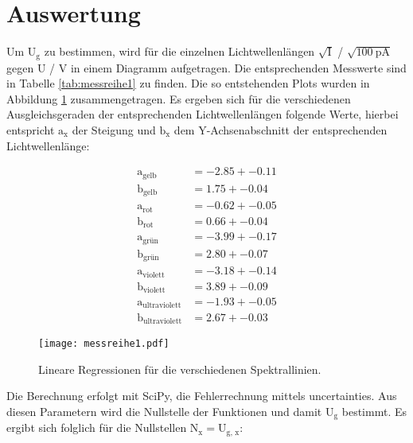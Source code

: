 \section{Auswertung}
\label{sec:Auswertung}
Um $\text{U}_\text{g}$ zu bestimmen, wird für die einzelnen Lichtwellenlängen $\sqrt{\text{I}}$ / $\sqrt{\SI{100}{\pico\ampere}}$ gegen $\text{U}$ / $\si{\volt}$ in einem Diagramm aufgetragen.
Die entsprechenden Messwerte sind in Tabelle \ref{tab:messreihe1} zu finden.
Die so entstehenden Plots wurden in Abbildung \ref{fig:messreihe1} zusammengetragen.
Es ergeben sich für die verschiedenen Ausgleichsgeraden der entsprechenden Lichtwellenlängen folgende Werte, hierbei entspricht $\text{a}_\text{x}$ der Steigung und $\text{b}_\text{x}$ dem Y-Achsenabschnitt der entsprechenden Lichtwellenlänge:

\begin{align*}
  \text{a}_\text{gelb} &= -2.85 +- 0.11         \\
  \text{b}_\text{gelb} &= 1.75 +- 0.04          \\
  \text{a}_\text{rot} &= -0.62 +- 0.05          \\
  \text{b}_\text{rot} &= 0.66 +- 0.04           \\
  \text{a}_\text{grün} &= -3.99 +- 0.17         \\
  \text{b}_\text{grün} &= 2.80 +- 0.07          \\
  \text{a}_\text{violett} &= -3.18 +- 0.14      \\
  \text{b}_\text{violett} &= 3.89 +- 0.09       \\
  \text{a}_\text{ultraviolett} &= -1.93 +- 0.05 \\
  \text{b}_\text{ultraviolett} &= 2.67 +- 0.03
\end{align*}

\FloatBarrier
\begin{figure}
  \centering
  \texttt{[image: messreihe1.pdf]}
  \caption{Lineare Regressionen für die verschiedenen Spektrallinien.}
  \label{fig:messreihe1}
\end{figure}
\FloatBarrier

Die Berechnung erfolgt mit SciPy, die Fehlerrechnung mittels uncertainties.
Aus diesen Parametern wird die Nullstelle der Funktionen und damit $\text{U}_\text{g}$ bestimmt.
Es ergibt sich folglich für die Nullstellen $\text{N}_\text{x} = \text{U}_\text{g, x}$:

